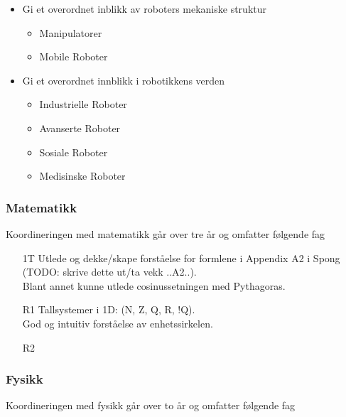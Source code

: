 \begin{itemize}
\begin{itemize}
							\item Gi et overordnet inblikk av roboters mekaniske struktur

							\begin{itemize}
								\item Manipulatorer
								\item Mobile Roboter
							\end{itemize}

							\item Gi et overordnet innblikk i robotikkens verden

							\begin{itemize}
								\item Industrielle Roboter
								\item Avanserte Roboter
								\item Sosiale Roboter
								\item Medisinske Roboter
							\end{itemize}

						\end{itemize}

		\end{itemize}


	\subsubsection*{Matematikk}

	Koordineringen med matematikk går over tre år og omfatter følgende fag

		\begin{itemize}

			\item[1T]  Utlede og dekke/skape forståelse for formlene i Appendix A2 i Spong (TODO: skrive dette ut/ta vekk ..A2..).\\
						Blant annet kunne utlede cosinussetningen med Pythagoras.
			\item[R1]  Tallsystemer i 1D: (N, Z, Q, R, !Q).\\
					   God og intuitiv forståelse av enhetssirkelen.
			\item[R2]

		\end{itemize}


	\subsubsection*{Fysikk}

	Koordineringen med fysikk går over to år og omfatter følgende fag


